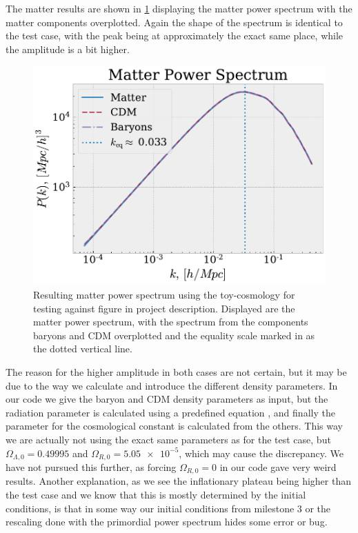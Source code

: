 \documentclass[10pt,a4paper]{article}
\providecommand{\rCDM}
{\ensuremath{
\textrm{CDM}
}
}
\begin{document}
\begin{appendices}
  The matter results are shown in \cref{fig: Matter toy} displaying the matter power spectrum with the matter components overplotted. Again the shape of the spectrum is identical to the test case, with the peak being at approximately the exact same place, while the amplitude is a bit higher.
  \begin{figure}[ht!]
    \centering
    \includegraphics[scale=0.5]{../figs/comp_PS_matteronly_toy.pdf}
    \caption{Resulting matter power spectrum using the toy-cosmology for testing against figure in project description. Displayed are the matter power spectrum, with the spectrum from the components baryons and \rCDM overplotted and the equality scale marked in as the dotted vertical line.}
    \label{fig: Matter toy}
  \end{figure}
  The reason for the higher amplitude in both cases are not certain, but it may be due to the way we calculate and introduce the different density parameters. In our code we give the baryon and \rCDM density parameters as input, but the radiation parameter is calculated using a predefined equation \citep{milestone1}, and finally the parameter for the cosmological constant is calculated from the others. This way we are actually not using the exact same parameters as for the test case, but $\Omega_{\Lambda,0} = 0.49995$ and $\Omega_{R,0} = \num{5.05e-5}$, which may cause the discrepancy. We have not pursued this further, as forcing $\Omega_{R,0}=0$ in our code gave very weird results. Another explanation, as we see the inflationary plateau being higher than the test case and we know that this is mostly determined by the initial conditions, is that in some way our initial conditions from milestone 3 or the rescaling done with the primordial power spectrum hides some error or bug.

\end{appendices}
\end{document}
